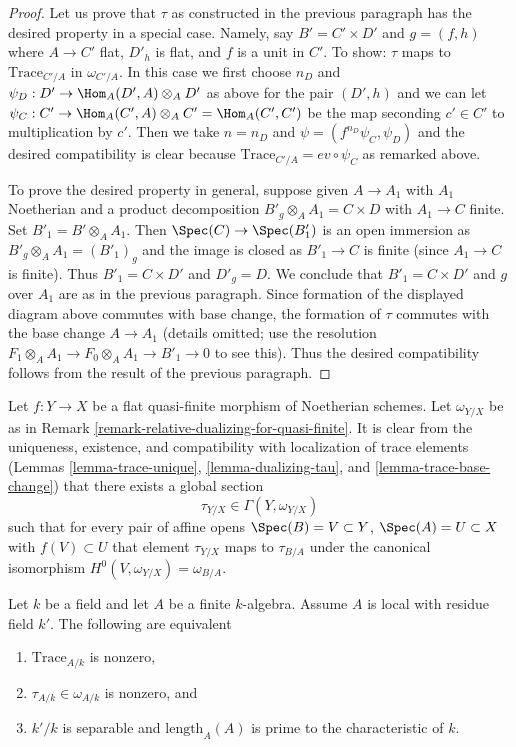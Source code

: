\begin{proof}
\medskip\noindent
Let us prove that $\tau$ as constructed in the previous paragraph
has the desired property in a special case. Namely, say
$B' = C' \times D'$ and $g = (f, h)$ where $A \to C'$ flat, $D'_h$ is flat, and
$f$ is a unit in $C'$.
To show: $\tau$ maps to $\text{Trace}_{C'/A}$ in $\omega_{C'/A}$.
In this case we first choose $n_D$ and
$\psi_D : D' \to \Hom_A(D', A) \otimes_A D'$ as above for the pair
$(D', h)$ and we can let
$\psi_C : C' \to \Hom_A(C', A) \otimes_A C' = \Hom_A(C', C')$
be the map seconding $c' \in C'$ to multiplication by $c'$.
Then we take $n = n_D$ and $\psi = (f^{n_D} \psi_C, \psi_D)$
and the desired compatibility is clear because
$\text{Trace}_{C'/A} = ev \circ \psi_C$ as remarked above.

\medskip\noindent
To prove the desired property in general, suppose given
$A \to A_1$ with $A_1$ Noetherian and a product decomposition
$B'_g \otimes_A A_1 = C \times D$ with $A_1 \to C$ finite.
Set $B'_1 = B' \otimes_A A_1$. Then $\Spec(C) \to \Spec(B'_1)$
is an open immersion as $B'_g \otimes_A A_1 = (B'_1)_g$ and
the image is closed as $B'_1 \to C$ is finite (since $A_1 \to C$
is finite). Thus $B'_1 = C \times D'$ and $D'_g = D$.
We conclude that $B'_1 = C \times D'$ and $g$ over $A_1$
are as in the previous paragraph.
Since formation of the displayed diagram above
commutes with base change, the formation of $\tau$ commutes
with the base change $A \to A_1$ (details omitted; use the
resolution $F_1 \otimes_A A_1 \to F_0 \otimes_A A_1 \to B'_1 \to 0$
to see this). Thus the desired compatibility follows from the result
of the previous paragraph.
\end{proof}

\begin{remark}
\label{remark-relative-dualizing-for-flat-quasi-finite}
Let $f : Y \to X$ be a flat quasi-finite morphism of Noetherian schemes.
Let $\omega_{Y/X}$ be as in
Remark \ref{remark-relative-dualizing-for-quasi-finite}.
It is clear from the uniqueness, existence, and compatibility with
localization of trace elements
(Lemmas \ref{lemma-trace-unique}, \ref{lemma-dualizing-tau}, and
\ref{lemma-trace-base-change})
that there exists a global section
$$
\tau_{Y/X} \in \Gamma(Y, \omega_{Y/X})
$$
such that for every pair of affine opens
$\Spec(B) = V \subset Y$, $\Spec(A) = U \subset X$ with $f(V) \subset U$
that element $\tau_{Y/X}$ maps to $\tau_{B/A}$ under the
canonical isomorphism
$H^0(V, \omega_{Y/X}) = \omega_{B/A}$.
\end{remark}

\begin{lemma}
\label{lemma-tau-nonzero}
Let $k$ be a field and let $A$ be a finite $k$-algebra. Assume $A$
is local with residue field $k'$. The following are equivalent
\begin{enumerate}
\item $\text{Trace}_{A/k}$ is nonzero,
\item $\tau_{A/k} \in \omega_{A/k}$ is nonzero, and
\item $k'/k$ is separable and $\text{length}_A(A)$ is prime
to the characteristic of $k$.
\end{enumerate}
\end{lemma}

